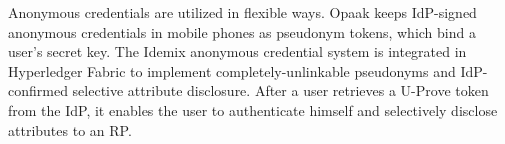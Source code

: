 
Anonymous credentials \cite{anon-credential-2001,anon-credential} are utilized in flexible ways.
Opaak \cite{Opaak} keeps IdP-signed anonymous credentials in mobile phones as pseudonym tokens,
    which bind a user's secret key.
The Idemix anonymous credential system \cite{idemix}
 is integrated in Hyperledger Fabric \cite{hyperledge-idemix} to implement completely-unlinkable pseudonyms
        and IdP-confirmed selective attribute disclosure.
After a user retrieves a U-Prove token \cite{uprov,uprove-conference} from the IdP,
    it enables the user to authenticate himself and selectively disclose attributes to an RP.

